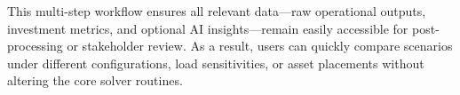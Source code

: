 This multi-step workflow ensures all relevant data—raw operational outputs, investment metrics, and optional AI 
insights—remain easily accessible for post-processing or stakeholder review. As a result, users can quickly compare 
scenarios under different configurations, load sensitivities, or asset placements without altering the core solver routines.






        

